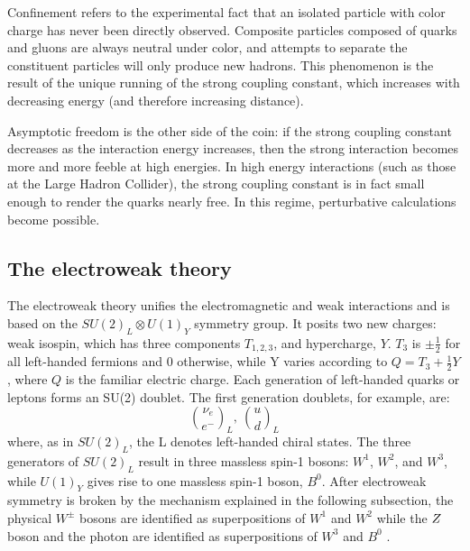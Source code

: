 Confinement refers to the experimental fact that an isolated particle with color charge has never been directly observed. Composite particles composed of quarks and gluons are always neutral under color, and attempts to separate the constituent particles will only produce new hadrons. This phenomenon is the result of the unique running of the strong coupling constant, which increases with decreasing energy (and therefore increasing distance).    

Asymptotic freedom is the other side of the coin: if the strong coupling constant decreases as the interaction energy increases, then the strong interaction becomes more and more feeble at high energies. In high energy interactions (such as those at the Large Hadron Collider), the strong coupling constant is in fact small enough to render the quarks nearly free. In this regime, perturbative calculations become possible.

\subsection{The electroweak theory}
The electroweak theory unifies the electromagnetic and weak interactions and is based on the $SU(2)_{L} \otimes U(1)_{Y}$ symmetry group. It posits two new charges: weak isospin, which has three components $T_{1,2,3}$, and hypercharge, $Y$. $T_{3}$ is $\pm\frac{1}{2}$ for all left-handed fermions and 0 otherwise, while Y varies according to $Q=T_{3}+\frac{1}{2}Y$, where $Q$ is the familiar electric charge. Each generation of left-handed quarks or leptons forms an SU(2) doublet. The first generation doublets, for example, are:
\begin{equation}
    \binom{\nu_{e}}{e^{-}}_{L},\ \binom{u}{d}_{L}
\end{equation}
where, as in $SU(2)_{L}$, the L denotes left-handed chiral states. The three generators of $SU(2)_{L}$ result in three massless spin-1 bosons: $W^{1}$, $W^{2}$, and $W^{3}$, while $U(1)_{Y}$ gives rise to one massless spin-1 boson, $B^{0}$. After electroweak symmetry is broken by the mechanism explained in the following subsection, the physical $W^{\pm}$ bosons are identified as superpositions of $W^{1}$ and $W^{2}$ while the $Z$ boson and the photon are identified as superpositions of $W^{3}$ and $B^{0}$ \cite{weinberg_leptons}.

